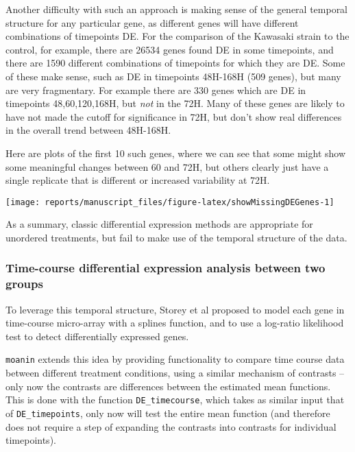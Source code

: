 \documentclass[9pt,a4paper,]{extarticle}
\begin{document}
Another difficulty with such an approach is making sense of the general
temporal structure for any particular gene, as different genes will have
different combinations of timepoints DE. For the comparison of the Kawasaki
strain to the control, for example, there are 26534 genes
found DE in some timepoints, and there are 1590 different
combinations of timepoints for which they are DE. Some of these make sense,
such as DE in timepoints 48H-168H (509 genes), but
many are very fragmentary. For example there are 330
genes which are DE in timepoints 48,60,120,168H, but \emph{not} in the 72H. Many of
these genes are likely to have not made the cutoff for significance in 72H,
but don't show real differences in the overall trend between 48H-168H.

Here are plots of the first 10 such genes, where we can see that some might
show some meaningful changes between 60 and 72H, but others clearly just have
a single replicate that is different or increased variability at 72H.

\begin{center}\texttt{[image: reports/manuscript\_files/figure-latex/showMissingDEGenes-1]} \end{center}

As a summary, classic differential expression methods are appropriate for
unordered treatments, but fail to make use of the temporal structure of the data.

\hypertarget{time-course-differential-expression-analysis-between-two-groups}{%
\subsubsection{Time-course differential expression analysis between two groups}\label{time-course-differential-expression-analysis-between-two-groups}}

To leverage this temporal structure, Storey et al \citep{storey:significance}
proposed to model each gene in time-course micro-array with a splines
function, and to use a log-ratio likelihood test to detect differentially
expressed genes.

\texttt{moanin} extends this idea by providing functionality to compare time course
data between different treatment conditions, using a similar mechanism of
contrasts -- only now the contrasts are differences between the estimated mean
functions. This is done with the function \texttt{DE\_timecourse}, which takes as
similar input that of \texttt{DE\_timepoints}, only now will test the entire mean
function (and therefore does not require a step of expanding the contrasts
into contrasts for individual timepoints).
\end{document}

